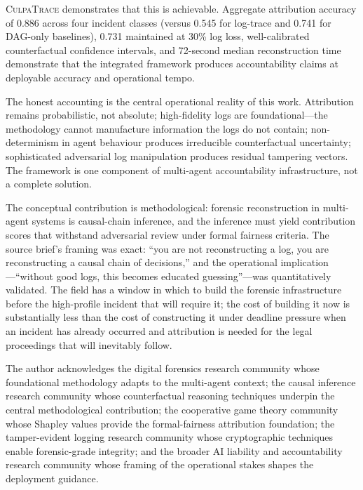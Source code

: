 \documentclass[sigconf,nonacm]{acmart}
\begin{document}
\textsc{CulpaTrace} demonstrates that this is achievable.
Aggregate attribution accuracy of 0.886 across four incident
classes (versus 0.545 for log-trace and 0.741 for DAG-only
baselines), 0.731 maintained at 30\% log loss, well-calibrated
counterfactual confidence intervals, and 72-second median
reconstruction time demonstrate that the integrated framework
produces accountability claims at deployable accuracy and
operational tempo.

The honest accounting is the central operational reality of this
work. Attribution remains probabilistic, not absolute;
high-fidelity logs are foundational---the methodology cannot
manufacture information the logs do not contain; non-determinism
in agent behaviour produces irreducible counterfactual uncertainty;
sophisticated adversarial log manipulation produces residual
tampering vectors. The framework is one component of multi-agent
accountability infrastructure, not a complete solution.

The conceptual contribution is methodological: forensic
reconstruction in multi-agent systems is causal-chain inference,
and the inference must yield contribution scores that withstand
adversarial review under formal fairness criteria. The source
brief's framing was exact: ``you are not reconstructing a log,
you are reconstructing a causal chain of decisions,'' and the
operational implication---``without good logs, this becomes
educated guessing''---was quantitatively validated. The field has
a window in which to build the forensic infrastructure before the
high-profile incident that will require it; the cost of building
it now is substantially less than the cost of constructing it under
deadline pressure when an incident has already occurred and
attribution is needed for the legal proceedings that will inevitably
follow.

\begin{acks}
The author acknowledges the digital forensics research community
whose foundational methodology adapts to the multi-agent context;
the causal inference research community whose counterfactual
reasoning techniques underpin the central methodological
contribution; the cooperative game theory community whose Shapley
values provide the formal-fairness attribution foundation; the
tamper-evident logging research community whose cryptographic
techniques enable forensic-grade integrity; and the broader AI
liability and accountability research community whose framing of
the operational stakes shapes the deployment guidance.
\end{acks}
\end{document}
